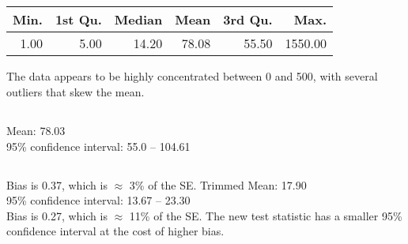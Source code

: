 \documentclass[twocolumn]{article}
\begin{document}


\clearpage



\newpage

\subsection{}
\begin{table}[h]
\begin{tabular}{@{}rrrrrr@{}}
\toprule
Min. & 1st Qu. & Median & Mean  & 3rd Qu. & Max.    \\ \midrule
1.00 & 5.00    & 14.20  & 78.08 & 55.50   & 1550.00 \\ \bottomrule
\end{tabular}
\end{table}
The data appears to be highly concentrated between 0 and 500, with several outliers that skew the mean.

\subsection{}
Mean: 78.03\\
95\% confidence interval: 55.0 -- 104.61
\subsection{}
Bias is 0.37, which is $\approx$ 3\% of the SE.
Trimmed Mean: 17.90\\
95\% confidence interval: 13.67 -- 23.30\\
Bias is 0.27, which is $\approx$ 11\% of the SE.
The new test statistic has a smaller 95\% confidence interval at the cost of higher bias.
\end{document}
